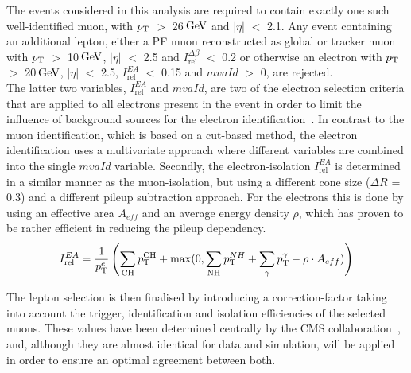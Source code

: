 The events considered in this analysis are required to contain exactly one such well-identified muon, with $p_{\rm T}$ $>$ 26$\, \mathrm{GeV}$ and $\vert \eta \vert$ $<$ 2.1. Any event containing an additional lepton, either a PF muon reconstructed as global or tracker muon with $p_{\rm T}$ $>$ 10$\, \mathrm{GeV}$, $\vert \eta \vert$ $<$ 2.5 and $I_{\textrm{rel}}^{\Delta \beta}$ $<$ 0.2 or otherwise an electron with $p_{\rm T}$ $>$ 20$\, \mathrm{GeV}$, $\vert \eta \vert$ $<$ 2.5, $I_{\textrm{rel}}^{EA}$ $<$ 0.15 and $mvaId$ $>$ 0, are rejected. 
\\
The latter two variables, $I_{\textrm{rel}}^{EA}$ and $mvaId$, are two of the electron selection criteria that are applied to all electrons present in the event in order to limit the influence of background sources for the electron identification~\cite{ElId8TeV}. In contrast to the muon identification, which is based on a cut-based method, the electron identification uses a multivariate approach where different variables are combined into the single $mvaId$ variable.
Secondly, the electron-isolation $I_{\textrm{rel}}^{EA}$ is determined in a similar manner as the muon-isolation, but using a different cone size ($\Delta R$ = 0.3) and a different pileup subtraction approach. For the electrons this is done by using an effective area $A_{eff}$ and an average energy density $\rho$, which has proven to be rather efficient in reducing the pileup dependency.%
\begin{equation}\label{eq::DeltaBetaIso}
 I_{\textrm{rel}}^{EA} = \frac{1}{p_{\rm T}^{e}} \left( \sum_{\textrm{CH}} p_{\rm T}^{\textrm{CH}} + \max(0, \sum_{\textrm{NH}} p_{\rm T}^{NH} + \sum_{\gamma} p_{\rm T}^{\gamma} - \rho \cdot A_{eff}) \right)
\end{equation}

The lepton selection is then finalised by introducing a correction-factor taking into account the trigger, identification and isolation efficiencies of the selected muons.
These values have been determined centrally by the CMS collaboration~\cite{MuonPerf8TeV}, and, although they are almost identical for data and simulation, will be applied in order to ensure an optimal agreement between both.

